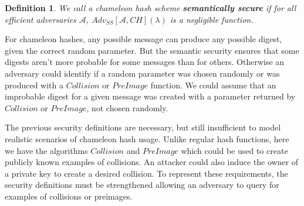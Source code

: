 \documentclass[a4paper]{article}
\newtheorem{definicao}{Definition}
\begin{document}
    \begin{definicao}
    We call a chameleon hash scheme \textbf{semantically secure} 
    if for all efficient adversaries $\mathcal{A}$,
    $Adv_{SS}[\mathcal{A},CH](\lambda)$ is a negligible function.
    \end{definicao}
    
    For chameleon hashes, any possible message can produce any possible
    digest, given the correct random parameter. But the semantic security
    ensures that some digests aren't more probable for some messages than
    for others. Otherwise an adversary could identify if a random 
    parameter was chosen randomly or was produced with a $Collision$ or
    $PreImage$ function. We could assume that an improbable digest for a
    given message was created with a parameter returned by $Collision$
    or $PreImage$, not chosen randomly.
    
    The previous security definitions are necessary, but still 
    insufficient to model realistic scenarios of chameleon hash usage. 
    Unlike regular hash functions, here we have the algorithms
    $Collision$ and $PreImage$ which could be used to create
    publicly known examples of collisions. An attacker could also
    induce the owner of a private key to create a desired
    collision. To represent these requirements, the security definitions
    must be strengthened allowing an adversary to query for examples
    of collisions or preimages.
    
\end{document}

